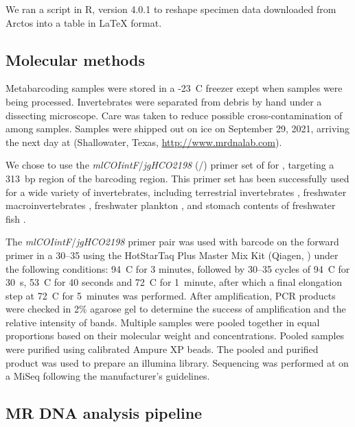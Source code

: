 \begin{multicols}{2}
We ran a script in R, version 4.0.1 \citep{RCoreTeam2021} to reshape specimen data downloaded from Arctos into a table in \LaTeX{} format.

\subsection{Molecular methods}

Metabarcoding samples were stored in a -23~\textdegree{}C freezer exept when samples were being processed. Invertebrates were separated from debris by hand under a dissecting microscope. Care was taken to reduce possible cross-contamination of  among samples. Samples were shipped out on ice on September 29, 2021, arriving the next day at  (Shallowater, Texas, \url{http://www.mrdnalab.com}).

We chose to use the \textit{mlCOIintF}/\textit{jgHCO2198} (\-/\-) primer set of \citet{Lerayetal2013} for , targeting a 313~bp region of the   barcoding region. This primer set has been successfully used for a wide variety of invertebrates, including terrestrial invertebrates \citep{Bowseretal2020}, freshwater macroinvertebrates \citep{Hajibabaeietal2019}, freshwater plankton \citep{Yangetal2017}, and stomach contents of freshwater fish \citep{BowserBowser2020}.

The \textit{mlCOIintF}/\textit{jgHCO2198} primer pair was used with barcode on the forward primer in a 30--35  using the HotStarTaq Plus Master Mix Kit (Qiagen, ) under the following conditions: 94~\textdegree{}C for 3 minutes, followed by 30--35 cycles of 94~\textdegree{}C for 30~s, 53~\textdegree{}C for 40 seconds and 72~\textdegree{}C for 1~minute, after which a final elongation step at 72~\textdegree{}C for 5~minutes was performed.  After amplification, PCR products were checked in 2\% agarose gel to determine the success of amplification and the relative intensity of bands. Multiple samples were pooled together in equal proportions based on their molecular weight and  concentrations. Pooled samples were purified using calibrated Ampure XP beads. The pooled and purified  product was used to prepare an illumina  library. Sequencing was performed at  on a MiSeq following the manufacturer’s guidelines. 

\subsection{MR DNA analysis pipeline}


\end{multicols}

